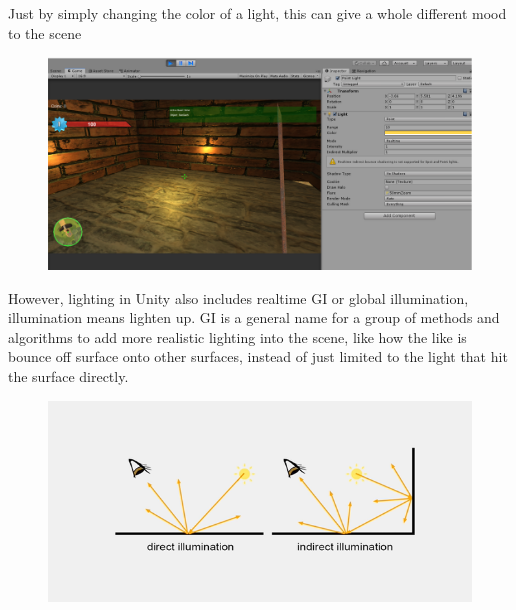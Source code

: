 \documentclass[a4paper, 13pt]{extarticle}
\begin{document}
{\begin{figure}[h]
{\begin{minipage}{.45\textwidth}
			\centering
			\label{fig:test27}
		\end{minipage}
	}
\end{figure}
  \vspace{5.5cm}
  Just by simply changing the color of a light, this can give a whole different mood to the scene
  \begin{figure}[h]
  	\begin{minipage}{1\textwidth}
  		\centering
  		\includegraphics[width=0.8\linewidth]{intructions/change_light_color.png}
  		\centering
  		\label{fig:test28}
  	\end{minipage}
  \end{figure}
 However, lighting in Unity also includes realtime GI or global illumination, illumination means lighten up. GI is a general name for a group of methods and algorithms to add more realistic lighting into the scene, like how the like is bounce off surface onto other surfaces, instead of just limited to the light that hit the surface directly. 
 \begin{figure}[h]
 	\begin{minipage}{1\textwidth}
 		\centering
 		\includegraphics[width=0.8\linewidth]{intructions/light_categlories.png}
 		\centering
 		\end{minipage}
 	\end{figure}
 \\[0.05cm]
}
\end{document}
